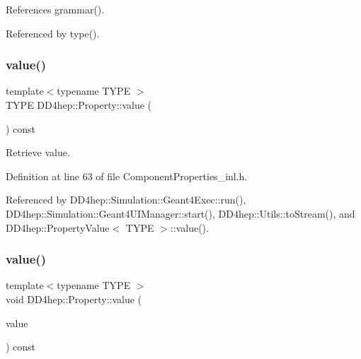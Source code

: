 References grammar().



Referenced by type().

\hypertarget{class_d_d4hep_1_1_property_a5caa53b1278d2e91da0606fbb312f967}{}\label{class_d_d4hep_1_1_property_a5caa53b1278d2e91da0606fbb312f967} 
\subsubsection{\texorpdfstring{value()}{value()}\hspace{0.1cm}{\footnotesize\ttfamily [1/2]}}
{\footnotesize\ttfamily template$<$typename T\+Y\+PE $>$ \\
T\+Y\+PE D\+D4hep\+::\+Property\+::value (\begin{DoxyParamCaption}{ }\end{DoxyParamCaption}) const}



Retrieve value. 



Definition at line 63 of file Component\+Properties\+\_\+inl.\+h.



Referenced by D\+D4hep\+::\+Simulation\+::\+Geant4\+Exec\+::run(), D\+D4hep\+::\+Simulation\+::\+Geant4\+U\+I\+Manager\+::start(), D\+D4hep\+::\+Utils\+::to\+Stream(), and D\+D4hep\+::\+Property\+Value$<$ T\+Y\+P\+E $>$\+::value().

\hypertarget{class_d_d4hep_1_1_property_aec0b744590dd9a7b2eb66dc733728c18}{}\label{class_d_d4hep_1_1_property_aec0b744590dd9a7b2eb66dc733728c18} 
\subsubsection{\texorpdfstring{value()}{value()}\hspace{0.1cm}{\footnotesize\ttfamily [2/2]}}
{\footnotesize\ttfamily template$<$typename T\+Y\+PE $>$ \\
void D\+D4hep\+::\+Property\+::value (\begin{DoxyParamCaption}\item[{T\+Y\+PE \&}]{value }\end{DoxyParamCaption}) const}



